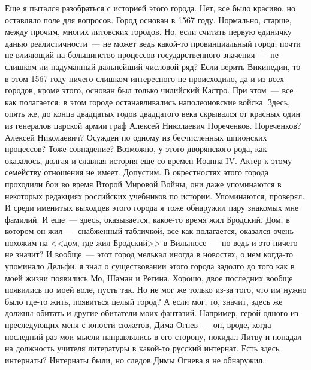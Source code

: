 Еще я пытался разобраться с историей этого города. Нет, все было красиво, но 
оставляло поле для вопросов. Город основан в 1567 году. Нормально, старше, 
между прочим, многих литовских городов. Но, если считать первую единичку данью 
реалистичности~--- не может ведь какой-то провинциальный город, почти не 
влияющий на большинство процессов государственного значения~--- не слишком ли надуманный 
дальнейший числовой ряд? Если верить Википедии, то в этом 1567 году ничего 
слишком интересного не происходило, да и из всех городов, кроме этого, основан 
был только чилийский Кастро. При этом~--- все как полагается: в этом городе 
останавливались наполеоновские войска. Здесь, опять же, до конца двадцатых 
годов двадцатого века скрывался от красных один из генералов царской армии граф 
Алексей Николаевич Пореченков. Пореченков? Алексей Николаевич? Осужден по 
одному из бесчисленных шпионских процессов? Тоже совпадение? Возможно, у этого 
дворянского рода, как оказалось, долгая и славная история еще со времен Иоанна 
IV. Актер к этому семейству отношения не имеет. Допустим. В окрестностях этого 
города проходили бои во время Второй Мировой Войны, они даже упоминаются в 
некоторых редакциях российских учебников по истории. Упоминаются, проверял. И 
среди именитых выходцев этого города я тоже обнаружил пару знакомых мне 
фамилий. И еще~--- здесь, оказывается, какое-то время жил Бродский. Дом, в котором он 
жил~--- снабженный табличкой, все как полагается, оказался очень похожим на <<дом, где 
жил Бродский>> в Вильнюсе~--- но ведь и это ничего не значит? И вообще~--- этот 
город мелькал иногда в новостях, о нем когда-то упоминало Дельфи, я знал о 
существовании этого города задолго до того как в моей жизни появились Мо, Шаман 
и Регина. Хорошо, двое последних вообще появились по моей воле, пусть так. Но 
не мог же только из-за того, что им нужно было где-то жить, появиться целый город? 
А если мог, то, значит, здесь же должны обитать и другие обитатели моих 
фантазий. Например, герой одного из преследующих меня с юности сюжетов, Дима 
Огнев~--- он, вроде, когда последний раз мои мысли направлялись в его сторону, 
покидал Литву и попадал на должность учителя литературы в какой-то русский 
интернат. Есть здесь интернаты? Интернаты были, но следов Димы Огнева я не 
обнаружил.

